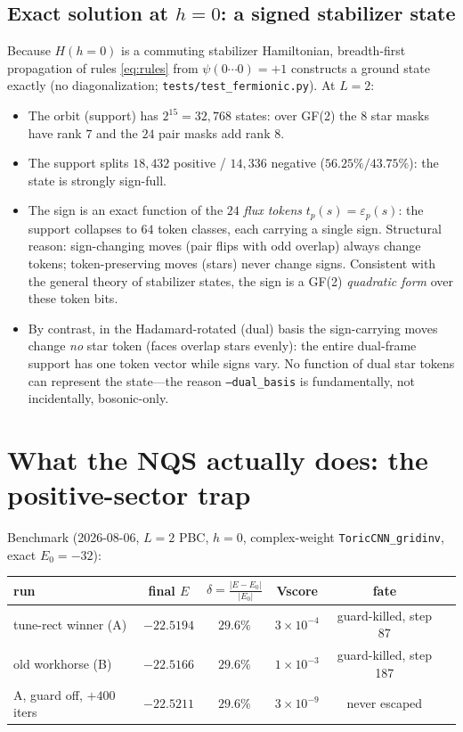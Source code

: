 \documentclass[11pt]{article}
\begin{document}
\subsection{Exact solution at $h=0$: a signed stabilizer state}
Because $H(h{=}0)$ is a commuting stabilizer Hamiltonian, breadth-first
propagation of rules \eqref{eq:rules} from $\psi(0\cdots0)=+1$ constructs a
ground state exactly (no diagonalization; \texttt{tests/test\_fermionic.py}).
At $L=2$:
\begin{itemize}
\item The orbit (support) has $2^{15}=32{,}768$ states: over GF(2) the $8$ star
masks have rank $7$ and the $24$ pair masks add rank $8$.
\item The support splits $18{,}432$ positive / $14{,}336$ negative
($56.25\%/43.75\%$): the state is strongly sign-full.
\item The sign is an exact function of the $24$ \emph{flux tokens}
$t_p(s)=\varepsilon_p(s)$: the support collapses to $64$ token classes, each
carrying a single sign. Structural reason: sign-changing moves (pair flips
with odd overlap) always change tokens; token-preserving moves (stars) never
change signs. Consistent with the general theory of stabilizer states, the
sign is a GF(2) \emph{quadratic form} over these token bits.
\item By contrast, in the Hadamard-rotated (dual) basis the sign-carrying
moves change \emph{no} star token (faces overlap stars evenly): the entire
dual-frame support has one token vector while signs vary. No function of dual
star tokens can represent the state---the reason \texttt{--dual\_basis} is
fundamentally, not incidentally, bosonic-only.
\end{itemize}

\section{What the NQS actually does: the positive-sector trap}
\label{sec:trap}

Benchmark (2026-08-06, $L=2$ PBC, $h=0$, complex-weight
\texttt{ToricCNN\_gridinv}, exact $E_0=-32$):

\begin{center}
\begin{tabular}{lccccl}
\toprule
run & final $E$ & $\delta=\frac{|E-E_0|}{|E_0|}$ & Vscore & fate \\
\midrule
tune-rect winner (A) & $-22.5194$ & $29.6\%$ & $3\times10^{-4}$ & guard-killed, step 87\\
old workhorse (B) & $-22.5166$ & $29.6\%$ & $1\times10^{-3}$ & guard-killed, step 187\\
A, guard off, $+400$ iters & $-22.5211$ & $29.6\%$ & $3\times10^{-9}$ & never escaped\\
\bottomrule
\end{tabular}
\end{center}
\end{document}
